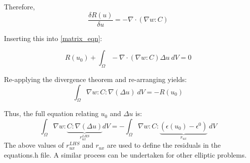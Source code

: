 \documentclass[10pt]{article} %
\begin{document}
Therefore,
\begin{equation}
\frac{\delta R(u)}{\delta u} = -\nabla \cdot (\nabla w: C)
\end{equation}

Inserting this into \ref{matrix_eqn}:

\begin{equation}
R(u_0) +  \int_{\Omega} -\nabla \cdot (\nabla w: C) \Delta u ~dV = 0
\end{equation}

Re-applying the divergence theorem and re-arranging yields:
\begin{equation}
\int_{\Omega} \nabla w :C: \nabla ( \Delta u) ~dV = -R(u_0) \label{matrix_eqn}
\end{equation}

Thus, the full equation relating $u_0$ and $\Delta u$ is:
\begin{equation}
\int_{\Omega} \nabla w : \underbrace{C : \nabla (\Delta u)}_{r_{ux}^{LHS}} dV = -\int_{\Omega}   \nabla w : C :\underbrace{(\epsilon(u_0)-\epsilon^0)}_{r_{ux}} ~dV
\end{equation}
The above values of $r_{ux}^{LHS}$ and $r_{ux}$ are used to define the residuals in the equations.h file. A similar process can be undertaken for other elliptic problems.
\end{document}
